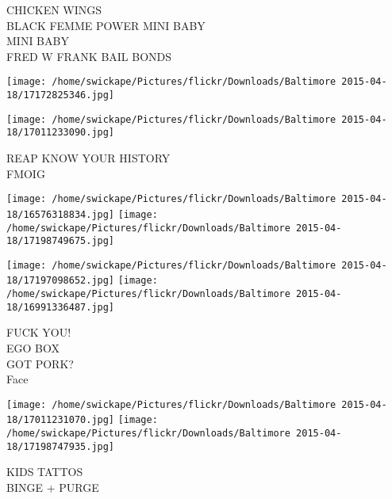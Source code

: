 \documentclass[10pt,letterpaper]{article}
\begin{document}
CHICKEN WINGS\\
BLACK FEMME POWER MINI BABY\\
MINI BABY\\
FRED W FRANK BAIL BONDS
\pagebreak

\texttt{[image: /home/swickape/Pictures/flickr/Downloads/Baltimore 2015-04-18/17172825346.jpg]}

\vspace{0.25in}
\texttt{[image: /home/swickape/Pictures/flickr/Downloads/Baltimore 2015-04-18/17011233090.jpg]}

REAP KNOW YOUR HISTORY\\
FMOIG
\pagebreak

\texttt{[image: /home/swickape/Pictures/flickr/Downloads/Baltimore 2015-04-18/16576318834.jpg]}
\texttt{[image: /home/swickape/Pictures/flickr/Downloads/Baltimore 2015-04-18/17198749675.jpg]}

\texttt{[image: /home/swickape/Pictures/flickr/Downloads/Baltimore 2015-04-18/17197098652.jpg]}
\texttt{[image: /home/swickape/Pictures/flickr/Downloads/Baltimore 2015-04-18/16991336487.jpg]}

FUCK YOU!\\
EGO BOX\\
GOT PORK?\\
Face
\pagebreak

\texttt{[image: /home/swickape/Pictures/flickr/Downloads/Baltimore 2015-04-18/17011231070.jpg]}
\texttt{[image: /home/swickape/Pictures/flickr/Downloads/Baltimore 2015-04-18/17198747935.jpg]}

KIDS TATTOS\\
BINGE + PURGE
\pagebreak
\end{document}
